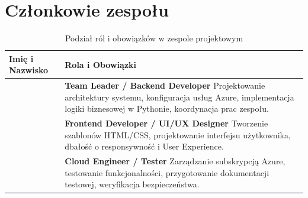 \documentclass[12pt,a4paper]{article}
\begin{document}
	\section{Członkowie zespołu}
	\begin{table}[h!]
		\centering
		\renewcommand{\arraystretch}{1.5}
		\begin{tabular}{|p{5cm}|p{9cm}|}
			\hline
			\textbf{Imię i Nazwisko} & \textbf{Rola i Obowiązki} \\
			\hline
			& \textbf{Team Leader / Backend Developer} \newline Projektowanie architektury systemu, konfiguracja usług Azure, implementacja logiki biznesowej w Pythonie, koordynacja prac zespołu. \\
			\hline
			& \textbf{Frontend Developer / UI/UX Designer} \newline Tworzenie szablonów HTML/CSS, projektowanie interfejsu użytkownika, dbałość o responsywność i User Experience. \\
			\hline
			& \textbf{Cloud Engineer / Tester} \newline Zarządzanie subskrypcją Azure, testowanie funkcjonalności, przygotowanie dokumentacji testowej, weryfikacja bezpieczeństwa. \\
			\hline
		\end{tabular}
		\caption{Podział ról i obowiązków w zespole projektowym}
	\end{table}
	
\end{document}
